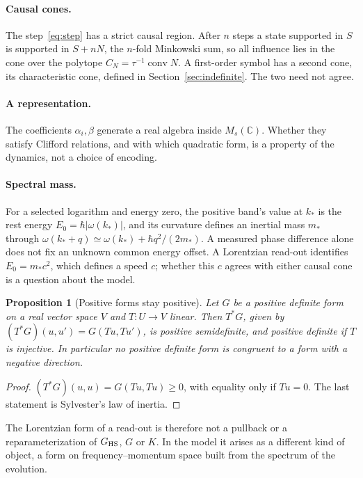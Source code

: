 \documentclass[12pt]{article}
\newtheorem{proposition}[theorem]{Proposition}
\theoremstyle{definition}
\theoremstyle{remark}
\newcommand{\conv}{\operatorname{conv}}
\begin{document}
\paragraph{Causal cones.} The step~\eqref{eq:step} has a strict causal region. After $n$ steps a state supported in $S$ is supported in $S+nN$, the $n$-fold Minkowski sum, so all influence lies in the cone over the polytope $C_N=\tau^{-1}\conv N$. A first-order symbol has a second cone, its characteristic cone, defined in Section~\ref{sec:indefinite}. The two need not agree.

\paragraph{A representation.} The coefficients $\alpha_i,\beta$ generate a real algebra inside $M_s(\mathbb C)$. Whether they satisfy Clifford relations, and with which quadratic form, is a property of the dynamics, not a choice of encoding.

\paragraph{Spectral mass.} For a selected logarithm and energy zero, the positive band's value at $k_*$ is the rest energy $E_0=\hbar|\omega(k_*)|$, and its curvature defines an inertial mass $m_*$ through $\omega(k_*+q)\simeq\omega(k_*)+\hbar q^2/(2m_*)$. A measured phase difference alone does not fix an unknown common energy offset. A Lorentzian read-out identifies $E_0=m_*c^2$, which defines a speed $c$; whether this $c$ agrees with either causal cone is a question about the model.

\begin{proposition}[Positive forms stay positive]
\label{prop:sylvester}
Let $G$ be a positive definite form on a real vector space $V$ and $T:U\to V$ linear. Then $T^*G$, given by $(T^*G)(u,u')=G(Tu,Tu')$, is positive semidefinite, and positive definite if $T$ is injective. In particular no positive definite form is congruent to a form with a negative direction.
\end{proposition}

\begin{proof}
$(T^*G)(u,u)=G(Tu,Tu)\ge0$, with equality only if $Tu=0$. The last statement is Sylvester's law of inertia.
\end{proof}

The Lorentzian form of a read-out is therefore not a pullback or a reparameterization of $G_{\rm HS}$, $G$ or $K$. In the model it arises as a different kind of object, a form on frequency--momentum space built from the spectrum of the evolution.
\end{document}
